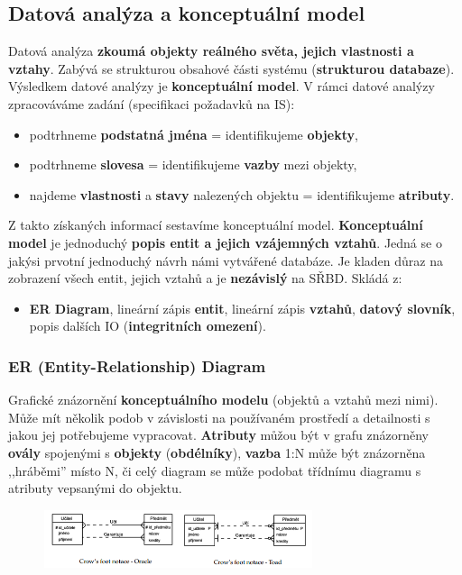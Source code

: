 \subsection{Datová analýza a konceptuální model}
Datová analýza \textbf{zkoumá objekty reálného světa, jejich vlastnosti a vztahy}. Zabývá se strukturou obsahové části systému (\textbf{strukturou databaze}). Výsledkem datové analýzy je \textbf{konceptuální model}. V rámci datové analýzy zpracováváme zadání (specifikaci požadavků na IS):

\begin{itemize}
\item podtrhneme \textbf{podstatná jména} = identifikujeme \textbf{objekty},
\item podtrhneme \textbf{slovesa} = identifikujeme \textbf{vazby} mezi objekty,
\item najdeme \textbf{vlastnosti} a \textbf{stavy} nalezených objektu = identifikujeme \textbf{atributy}.
\end{itemize}

Z takto získaných informací sestavíme konceptuální model. \textbf{Konceptuální model} je jednoduchý \textbf{popis entit a jejich vzájemných vztahů}. Jedná se o jakýsi prvotní jednoduchý návrh námi vytvářené databáze. Je kladen důraz na zobrazení všech entit, jejich vztahů a je \textbf{nezávislý} na SŘBD. Skládá z:
\begin{itemize}
\item \textbf{ER Diagram}, lineární zápis \textbf{entit}, lineární zápis \textbf{vztahů}, \textbf{datový slovník}, popis dalších IO (\textbf{integritních omezení}).
\end{itemize}

\subsubsection{ER (Entity-Relationship) Diagram}
Grafické znázornění \textbf{konceptuálního modelu} (objektů a vztahů mezi nimi). Může mít několik podob v závislosti na používaném prostředí a detailnosti s jakou jej potřebujeme vypracovat. \textbf{Atributy} můžou být v grafu znázorněny \textbf{ovály} spojenými s \textbf{objekty} (\textbf{obdélníky}), \textbf{vazba} 1:N může být znázorněna ,,hráběmi'' místo N, či celý diagram se může podobat třídnímu diagramu s atributy vepsanými do objektu.

\begin{figure}[H]
	\centering
	\includegraphics[width=0.7\textwidth]{assets/erdiagram.png}
\end{figure}

